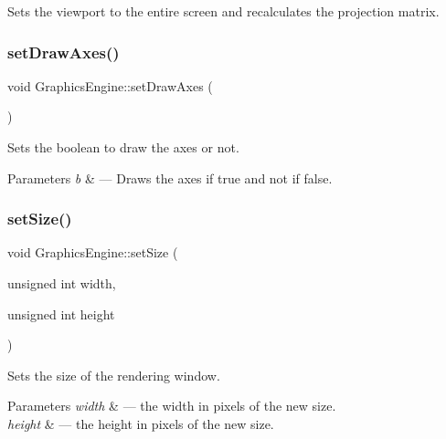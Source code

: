 Sets the viewport to the entire screen and recalculates the projection matrix. \mbox{\label{class_graphics_engine_ad2db9b0562fcbd96f9cab67a8be451ce}} 
\subsubsection{\texorpdfstring{set\+Draw\+Axes()}{setDrawAxes()}}
{\footnotesize\ttfamily void Graphics\+Engine\+::set\+Draw\+Axes (\begin{DoxyParamCaption}{ }\end{DoxyParamCaption})}



Sets the boolean to draw the axes or not. 


\begin{DoxyParams}{Parameters}
{\em b} & --- Draws the axes if true and not if false. \\
\hline
\end{DoxyParams}
\mbox{\label{class_graphics_engine_aac1a9cc3d195ed1f28018dffd80dae41}} 
\subsubsection{\texorpdfstring{set\+Size()}{setSize()}}
{\footnotesize\ttfamily void Graphics\+Engine\+::set\+Size (\begin{DoxyParamCaption}\item[{unsigned int}]{width,  }\item[{unsigned int}]{height }\end{DoxyParamCaption})}



Sets the size of the rendering window. 


\begin{DoxyParams}{Parameters}
{\em width} & --- the width in pixels of the new size.\\
\hline
{\em height} & --- the height in pixels of the new size. \\
\hline
\end{DoxyParams}
\mbox{\label{class_graphics_engine_adb11cc7d06a8fa721d2037791297f102}} 

